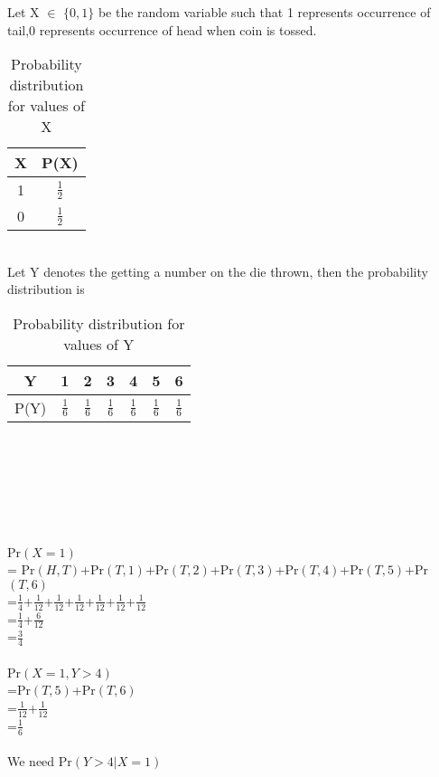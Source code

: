 \documentclass[journal,12pt,twocolumn]{IEEEtran}
\begin{document}
Let X $\in$ $\{0,1\}$ be the random variable such that 1 represents occurrence of tail,0 represents occurrence of head when coin is tossed.
\begin{table}[ht]
\caption{Probability distribution for values of X}
\begin{center}
    \begin{tabular}{|c|c|}
    \hline
    X & P(X)\\
    \hline
    1 & $\frac{1}{2}$ \\
    \hline
    0 & $\frac{1}{2}$\\
    \hline
    \end{tabular}
\end{center} 
\end{table}
\\Let Y denotes the getting a number on the die thrown, then the probability distribution is
\begin{table}[ht]
\caption{Probability distribution for values of Y}
\begin{center}
    \begin{tabular}{|c|c|c|c|c|c|c|}
    \hline
    Y & 1 & 2 & 3 & 4 & 5 & 6 \\
    \hline
    P(Y) & $\frac{1}{6}$ & $\frac{1}{6}$ & $\frac{1}{6}$ & $\frac{1}{6}$ & $\frac{1}{6}$ & $\frac{1}{6}$  \\
    \hline
    \end{tabular}
\end{center} 
\end{table}
\\\\\\\\\\\\
Pr$(X=1)$\\
= Pr$(H,T)$+Pr$(T,1)$+Pr$(T,2)$+Pr$(T,3)$+Pr$(T,4)$+Pr$(T,5)$+Pr$(T,6)$ \\ 
=$\frac{1}{4}$+$\frac{1}{12}$+$\frac{1}{12}$+$\frac{1}{12}$+$\frac{1}{12}$+$\frac{1}{12}$+$\frac{1}{12}$\\
=$\frac{1}{4}$+$\frac{6}{12}$\\
=$\frac{3}{4}$\\\\
Pr$(X=1,Y>4)$\\
=Pr$(T,5)$+Pr$(T,6)$\\
=$\frac{1}{12}$+$\frac{1}{12}$\\
=$\frac{1}{6}$\\\\
We need Pr$(Y>4|X=1)$\\
\end{document}
